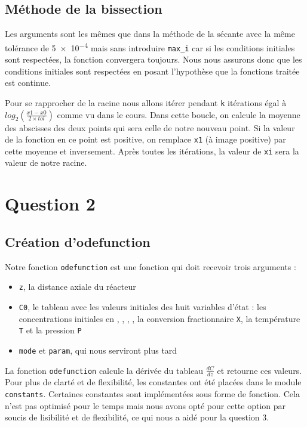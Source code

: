 \documentclass[11pt]{report}
\newcommand{\mychapter}[2]{
  \setcounter{chapter}{#1}
  \setcounter{section}{0}
  \chapter*{#2}
  \addcontentsline{toc}{chapter}{#2}
}
\begin{document}
    \section{Méthode de la bissection}
      Les arguments sont les mêmes que dans la méthode de la sécante avec la même tolérance de \num{5e-4} mais sans introduire \verb|max_i|
      car si les conditions initiales sont respectées, la fonction convergera toujours.
      Nous nous assurons donc que les conditions initiales sont respectées en posant l'hypothèse que la fonctions traitée est continue.
      \par
      Pour se rapprocher de la racine nous allons itérer pendant \verb|k| itérations égal à
      $log_2(\frac{x1-x0}{2\times tol})$ comme vu dans le cours.
      Dans cette boucle, on calcule la moyenne des abscisses des deux points qui sera celle de notre nouveau point.
      Si la valeur de la fonction en ce point est positive, on remplace \verb|x1| (à image positive) par cette moyenne et inversement.
      Après toutes les itérations, la valeur de \verb|xi| sera la valeur de notre racine.

  \mychapter{2}{Question 2}
    \section{Création d'odefunction}
      Notre fonction \verb|odefunction| est une fonction qui doit recevoir trois arguments :
      \begin{itemize}
        \item \verb|z|, la distance axiale du réacteur
        \item \verb|C0|, le tableau avec les valeurs initiales des huit variables d'état :
          les concentrations initiales en , , , , 
          la conversion fractionnaire \verb|X|,
          la température \verb|T|
          et la pression \verb|P|
        \item \verb|mode| et \verb|param|, qui nous serviront plus tard
      \end{itemize}
      La fonction \verb|odefunction| calcule la dérivée du tableau $\frac{dC}{dz}$ et retourne ces valeurs.
      Pour plus de clarté et de flexibilité, les constantes ont été placées dans le module \verb|constants|.
      Certaines constantes sont implémentées sous forme de fonction.
      Cela n'est pas optimisé pour le temps mais nous avons opté pour cette option par soucis de lisibilité
      et de flexibilité, ce qui nous a aidé pour la question 3.
\end{document}
